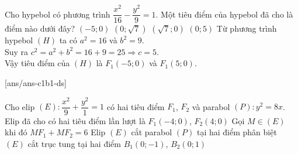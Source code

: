 \begin{ex}%
	Cho hypebol có phương trình $\dfrac{x^2}{16}-\dfrac{y^2}{9}=1$. Một tiêu điểm của hypebol đã cho là điểm nào dưới đây?
	\choice
	{\True $(-5;0)$}
	{$\left(0;\sqrt{7}\right)$}
	{$\left(\sqrt{7};0\right)$}
	{$(0;5)$}
	\loigiai
	{
	Từ phương trình hypebol $(H)$ ta có $a^2=16$ và $b^2=9$.\\
	Suy ra $c^2=a^2+b^2=16+9=25 \Rightarrow c=5$.\\
	Vậy tiêu điểm của $(H)$ là $F_1\left(-5;0\right)$ và $F_1\left(5;0\right)$.
	}
\end{ex}
 
\setcounter{ex}{0}
[ans/ans-c1b1-ds]
\begin{ex}%
	Cho elip $(E)\colon \dfrac{x^2}{9}+\dfrac{y^2}{1}=1$ có hai tiêu điểm $F_1$, $F_2$ và parabol $(P)\colon y^2=8x$.
	\choiceTF
	{Elip đã cho có hai tiêu điểm lần lượt là $F_1(-4;0)$, $F_2(4;0)$}
	{\True Gọi $M\in (E)$ khi đó $MF_1+MF_2=6$}
	{\True Elip $(E)$ cắt parabol $(P)$ tại hai điểm phân biệt}
	{\True $(E)$ cắt trục tung tại hai điểm $B_1(0;-1)$, $B_2(0;1)$}
\end{ex}
